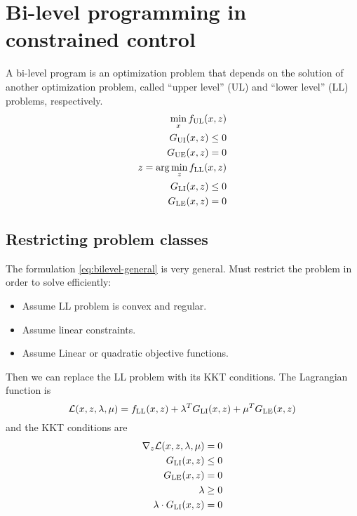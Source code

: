 \section{Bi-level programming in constrained control}
A bi-level program is an optimization problem that depends on the solution of another optimization problem, called ``upper level'' (UL) and ``lower level'' (LL) problems, respectively.
%
\begin{equation}\label{eq:bilevel-general}
\begin{split}
    \min_x f_\mathrm{UL}(x,z) \\
    G_\mathrm{UI}(x,z) \leq 0 \\
    G_\mathrm{UE}(x,z) = 0 \\
    z = \arg \min_z f_\mathrm{LL}(x,z) \\
    G_\mathrm{LI}(x,z) \leq 0 \\
    G_\mathrm{LE}(x,z) = 0
\end{split}
\end{equation}

\subsection{Restricting problem classes}
The formulation \eqref{eq:bilevel-general} is very general. Must restrict the problem in order to solve efficiently:
%
\begin{itemize}
    \item Assume LL problem is convex and regular.
    \item Assume linear constraints.
    \item Assume Linear or quadratic objective functions.
\end{itemize}
%
Then we can replace the LL problem with its KKT conditions. The Lagrangian function is
%
\begin{equation}
    \mathcal{L}(x,z,\lambda,\mu) = f_\mathrm{LL}(x,z) + \lambda^T G_\mathrm{LI}(x,z) + \mu^T G_\mathrm{LE}(x,z)
\end{equation}
%
and the KKT conditions are
%
\begin{equation}
\begin{split}
    \nabla_z \mathcal{L}(x,z,\lambda,\mu) = 0 \\
    G_\mathrm{LI}(x,z) \leq 0 \\
    G_\mathrm{LE}(x,z) = 0 \\
    \lambda \geq 0 \\
    \lambda \cdot G_\mathrm{LI}(x,z) = 0
\end{split}
\end{equation}

